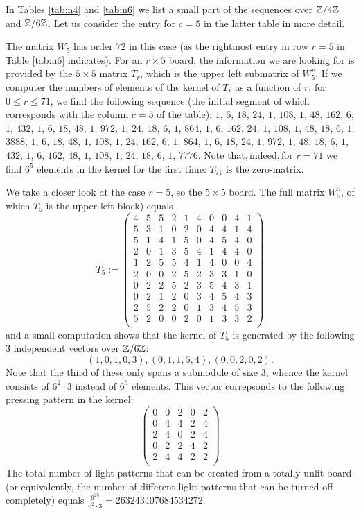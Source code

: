\begin{example}
In Tables \ref{tab:n4} and \ref{tab:n6} we list a small part of the
sequences over $\mathbb{Z}/4\mathbb{Z}$ and $\mathbb{Z}/6\mathbb{Z}$. Let us consider the
entry for $c=5$ in the latter table in more detail.

The matrix $W_5$ has order $72$ in this case (as the rightmost entry
in row $r=5$ in Table \ref{tab:n6} indicates). For an $r\times 5$
board, the information we are looking for is provided by the
$5\times 5$ matrix $T_r$, which is the upper left submatrix of $W_5^r$.
If we computer the numbers of elements of the kernel of $T_r$ as a
function of $r$, for $0\leq r\leq 71$, we find the following
sequence (the initial segment
of which corresponds with the column $c=5$ of the table):
$1$, $6$, $18$, $24$, $1$, $108$, $1$, $48$, $162$, $6$, $1$, $432$, $1$, $6$, $18$, $48$, $1$, $972$, $1$, $24$, $18$, $
6$, $1$, $864$, $1$, $6$, $162$, $24$, $1$, $108$, $1$, $48$, $18$, $6$, $1$, $3888$, $1$, $6$, $18$, $48$, $1$, $108$, $
1$, $24$, $162$, $6$, $1$, $864$, $1$, $6$, $18$, $24$, $1$, $972$, $1$, $48$, $18$, $6$, $1$, $432$, $1$, $6$, $162$, $
48$, $1$, $108$, $1$, $24$, $18$, $6$, $1$, $7776$.
Note that$, $indeed$, $for $r=71$ we find $6^5$ elements in the kernel
for the first time: $T_{71}$ is the zero-matrix.

We take a closer look at the case $r=5$, so the $5\times 5$ board.
The full matrix $W_5^5$, of which $T_5$ is the upper left block)
equals
$$T_5 := \left(
\begin{array}{cccccccccc}
4&5&5&2&1&4&0&0&4&1\\
5&3&1&0&2&0&4&4&1&4\\
5&1&4&1&5&0&4&5&4&0\\
2&0&1&3&5&4&1&4&4&0\\
1&2&5&5&4&1&4&0&0&4\\
2&0&0&2&5&2&3&3&1&0\\
0&2&2&5&2&3&5&4&3&1\\
0&2&1&2&0&3&4&5&4&3\\
2&5&2&2&0&1&3&4&5&3\\
5&2&0&0&2&0&1&3&3&2\\
\end{array}
\right)$$
and a small computation shows that the kernel of $T_5$
is generated by the following 3 independent vectors over $\mathbb{Z}/6\mathbb{Z}$:
$$(1, 0, 1, 0, 3), (0, 1, 1, 5, 4), (0, 0, 2, 0, 2).$$
Note that the third of these only spans a submodule of size $3$,
whence the kernel consists of $6^2\cdot 3$ instead of $6^3$
elements. This vector correpsonds to the following
pressing pattern in the kernel:
$$\left(
\begin{array}{cccccccccc}
0&0&2&0&2\\
0&4&4&2&4\\
2&4&0&2&4\\
0&2&2&4&2\\
2&4&4&2&2\\
\end{array}
\right)$$
The total number of light patterns that can be created from
a totally unlit board (or equivalently, the number of different
light patterns that can be turned off completely) equals 
$\frac{6^{25}}{6^2\cdot 3}=263243407684534272$.
\end{example}
